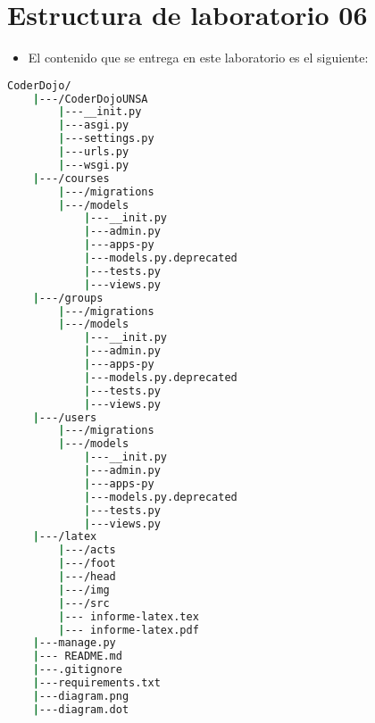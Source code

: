 \section{Estructura de laboratorio 06}
\begin{itemize}
	\item El contenido que se entrega en este laboratorio es el siguiente:
\end{itemize}
\begin{lstlisting}[language=bash]
  CoderDojo/
    |---/CoderDojoUNSA
        |---__init.py
        |---asgi.py
        |---settings.py
        |---urls.py
        |---wsgi.py
    |---/courses
        |---/migrations
        |---/models
            |---__init.py
            |---admin.py
            |---apps-py
            |---models.py.deprecated
            |---tests.py
            |---views.py
    |---/groups
        |---/migrations
        |---/models
            |---__init.py
            |---admin.py
            |---apps-py
            |---models.py.deprecated
            |---tests.py
            |---views.py
    |---/users
        |---/migrations
        |---/models
            |---__init.py
            |---admin.py
            |---apps-py
            |---models.py.deprecated
            |---tests.py
            |---views.py   
    |---/latex
        |---/acts
        |---/foot
        |---/head
        |---/img
        |---/src
        |--- informe-latex.tex
        |--- informe-latex.pdf
    |---manage.py
    |--- README.md
    |---.gitignore
    |---requirements.txt
    |---diagram.png
    |---diagram.dot
  \end{lstlisting}